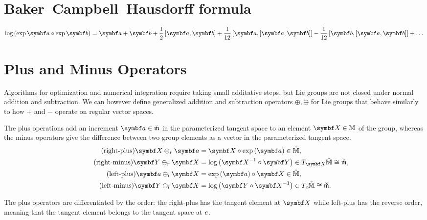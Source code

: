 \section{Baker–Campbell–Hausdorff formula}


\begin{equation}
  \label{eq:bch_formula}
  \log \left(\exp \a \circ \exp \b \right) = \a + \b + \frac{1}{2} \left[ \a, \b \right] + \frac{1}{12} \left[ \a, \left[ \a, \b \right]\right] - \frac{1}{12} \left[ \b, \left[ \a, \b \right]\right] + \ldots
\end{equation}

\section{Plus and Minus Operators}

Algorithms for optimization and numerical integration require taking small additative steps, but Lie groups are not closed under normal addition and subtraction. We can however define generalized addition and subtraction operators $\oplus, \ominus$ for Lie groups that behave similarly to how $+$ and $-$ operate on regular vector spaces.


\begin{important}%
  The plus operations add an increment $\a \in \clM$ in the parameterized tangent space to an element $\X \in \M$ of the group, whereas the minus operators give the difference between two group elements as a vector in the parameterized tangent space.
  \begin{align}
    \label{eq:right-plus}
    \tag{right-plus} \X \oplus_r {{\a}}
     & = \X \circ \exp \left( {{\a}} \right) \in \cM,                     \\
    \label{eq:right-minus}
    \tag{right-minus}\Y \ominus_r \X
     & =  \log \left( \X^{-1} \circ \Y \right) \in T_{\X} \cM \cong \clM, \\
    \label{eq:left-plus}
    \tag{left-plus} \a \oplus_l \X
     & = \exp \left( {{\a}} \right) \circ \X \in \cM,                     \\
    \label{eq:left-minus}
    \tag{left-minus}\Y \ominus_l \X
     & =  \log \left( \Y \circ \X^{-1} \right) \in T_\id \cM \cong \clM .
  \end{align}
\end{important}
The plus operators are differentiated by the order: the right-plus has the tangent element at $\X$ while left-plus has the reverse order, meaning that the tangent element belongs to the tangent space at $e$.

